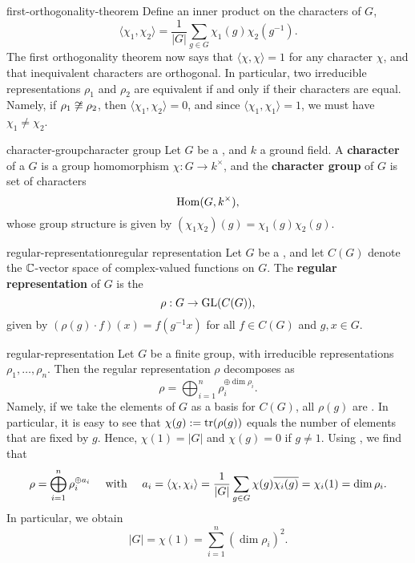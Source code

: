 \begin{example}{first-orthogonality-theorem}
    Define an inner product on the characters of $G$,
    \[ \langle \chi_1, \chi_2 \rangle = \frac{1}{|G|} \sum_{g \in G} \chi_1(g) \chi_2(g^{-1}) . \]
    The first orthogonality theorem now says that $\langle \chi, \chi \rangle = 1$ for any character $\chi$, and that inequivalent characters are orthogonal. In particular, two irreducible representations $\rho_1$ and $\rho_2$ are equivalent if and only if their characters are equal. Namely, if $\rho_1 \not\cong \rho_2$, then $\langle \chi_1, \chi_2 \rangle = 0$, and since $\langle \chi_1, \chi_1 \rangle = 1$, we must have $\chi_1 \ne \chi_2$.
\end{example}

\begin{topic}{character-group}{character group}
    Let $G$ be a , and $k$ a ground field. A \textbf{character} of a $G$ is a group homomorphism $\chi : G \to k^\times$, and the \textbf{character group} of $G$ is set of characters
    \[ \operatorname{Hom}(G, k^\times) , \]
    whose group structure is given by $(\chi_1 \chi_2)(g) = \chi_1(g) \chi_2(g)$.
\end{topic}

\begin{topic}{regular-representation}{regular representation}
    Let $G$ be a , and let $C(G)$ denote the $\mathbb{C}$-vector space of complex-valued functions on $G$. The \textbf{regular representation} of $G$ is the 
    \[ \rho : G \to \textup{GL}(C(G)) , \]
    given by $(\rho(g) \cdot f)(x) = f(g^{-1} x)$ for all $f \in C(G)$ and $g, x \in G$.
\end{topic}

\begin{example}{regular-representation}
    Let $G$ be a finite group, with irreducible representations $\rho_1, \ldots, \rho_n$. Then the regular representation $\rho$ decomposes as
    \[ \rho = \bigoplus_{i = 1}^{n} \rho_i^{\oplus \dim \rho_i} . \]
    Namely, if we take the elements of $G$ as a basis for $C(G)$, all $\rho(g)$ are . In particular, it is easy to see that $\chi(g) := \operatorname{tr}(\rho(g))$ equals the number of elements that are fixed by $g$. Hence, $\chi(1) = |G|$ and $\chi(g) = 0$ if $g \ne 1$. Using , we find that
    \[ \rho = \bigoplus_{i = 1}^{n} \rho_i^{\oplus a_i} \quad \textup{ with } \quad a_i = \langle \chi, \chi_i \rangle = \frac{1}{|G|} \sum_{g \in G} \chi(g) \overline{\chi_i(g)} = \chi_i(1) = \dim \rho_i . \]
    In particular, we obtain
    \[ |G| = \chi(1) = \sum_{i = 1}^{n} (\dim \rho_i)^2 . \]
\end{example}

